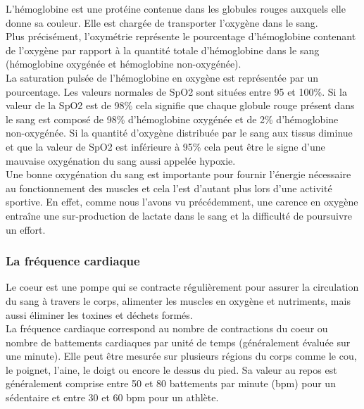         L’hémoglobine est une protéine contenue dans les globules rouges auxquels elle donne sa couleur. Elle est chargée de transporter l’oxygène dans le sang.\\
        
        Plus précisément, l'oxymétrie représente le pourcentage d’hémoglobine contenant de l’oxygène par rapport à la quantité totale d’hémoglobine dans le sang (hémoglobine oxygénée et hémoglobine non-oxygénée). \\
        
        La saturation pulsée de l’hémoglobine en oxygène est représentée par un pourcentage. Les valeurs normales de SpO2 sont situées entre 95 et 100\%. Si la valeur de la SpO2 est de 98\% cela signifie que chaque globule rouge présent dans le sang est composé de 98\% d’hémoglobine oxygénée et de 2\% d’hémoglobine non-oxygénée. Si la quantité d’oxygène distribuée par le sang aux tissus diminue et que la valeur de SpO2 est inférieure à 95\% cela peut être le signe d’une mauvaise oxygénation du sang aussi appelée hypoxie.\\

        Une bonne oxygénation du sang est importante pour fournir l’énergie nécessaire au fonctionnement des muscles et cela l'est d'autant plus lors d’une activité sportive. En effet, comme nous l'avons vu précédemment, une carence en oxygène entraîne une sur-production de lactate dans le sang et la difficulté de poursuivre un effort.\\
        
        
        \subsubsection{La fréquence cardiaque}
        \label{frequence_cardiaque}
           
        Le coeur est une pompe qui se contracte régulièrement pour assurer la circulation du sang à travers le corps, alimenter les muscles en oxygène et nutriments, mais aussi éliminer les toxines et déchets formés.\\
        
        La fréquence cardiaque correspond au nombre de contractions du coeur ou nombre de battements cardiaques par unité de temps (généralement évaluée sur une minute). Elle peut être mesurée sur plusieurs régions du corps comme le cou, le poignet, l’aine, le doigt ou encore le dessus du pied.
        Sa valeur au repos est généralement comprise entre 50 et 80 battements par minute (bpm) pour un sédentaire et entre 30 et 60 bpm pour un athlète.\\
     
